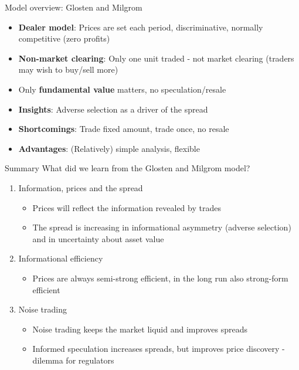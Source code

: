 \documentclass[english,10pt
,aspectratio=169
]{beamer}
\begin{document}
\begin{frame}[label=overview]{Model overview: Glosten and Milgrom}
	\begin{itemize}
		\item \textbf{Dealer model}: Prices are set each period, discriminative, normally competitive (zero profits)
		\item \textbf{Non-market clearing}: Only one unit traded  - not market clearing (traders may wish to buy/sell more)
		\item Only \textbf{fundamental value} matters,  no speculation/resale
	\end{itemize}
	\begin{itemize}
		\item \textbf{Insights}: Adverse selection as a driver of the spread
		\item \textbf{Shortcomings}: Trade fixed amount, trade once, no resale
		\item \textbf{Advantages}: (Relatively) simple analysis, flexible %
	\end{itemize}
\end{frame}


\begin{frame}{Summary}
	What did we learn from the Glosten and Milgrom model?
	\begin{enumerate}
		\item Information, prices and the spread
		\begin{itemize}
			\item Prices will reflect the information revealed by trades
			\item The spread is increasing in informational asymmetry (adverse selection) and in uncertainty about asset value
		\end{itemize}
		\item Informational efficiency
		\begin{itemize}
			\item Prices are always semi-strong efficient, in the long run also strong-form efficient
		\end{itemize}
		\item Noise trading
		\begin{itemize}
			\item Noise trading keeps the market liquid and improves spreads
			\item Informed speculation increases spreads, but improves price discovery - dilemma for regulators
		\end{itemize}
	\end{enumerate}
\end{frame}
\end{document}
